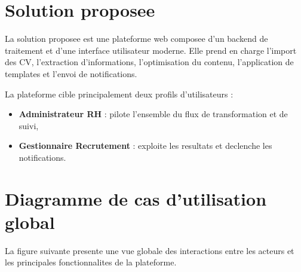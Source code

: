 \section{Solution proposee}
La solution proposee est une plateforme web composee d'un backend de traitement et d'une interface utilisateur moderne. Elle prend en charge l'import des CV, l'extraction d'informations, l'optimisation du contenu, l'application de templates et l'envoi de notifications.

La plateforme cible principalement deux profils d'utilisateurs :
\begin{itemize}[label=--]
    \item \textbf{Administrateur RH} : pilote l'ensemble du flux de transformation et de suivi,
    \item \textbf{Gestionnaire Recrutement} : exploite les resultats et declenche les notifications.
\end{itemize}

\section{Diagramme de cas d'utilisation global}
La figure suivante presente une vue globale des interactions entre les acteurs et les principales fonctionnalites de la plateforme.

